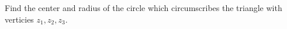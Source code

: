 Find the center and radius of the circle which circumscribes the triangle with verticies
$z_1, z_2,z_3$.\\
